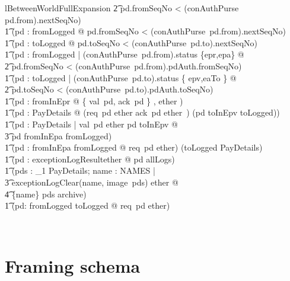 \begin{LNewLemma}
\begin{theorem}{lBetweenWorldFullExpansion}
                \t2 \land pd.fromSeqNo < (conAuthPurse~ pd.from).nextSeqNo) \land \\ \t1
            (\forall pd : fromLogged @  pd.fromSeqNo < (conAuthPurse~pd.from).nextSeqNo) \land \\ \t1
            (\forall pd : toLogged @ pd.toSeqNo < (conAuthPurse~pd.to).nextSeqNo) \land  \\ \t1
            (\forall pd : fromLogged | (conAuthPurse~pd.from).status \in \{epr,epa\} @  \\ %
                \t2 pd.fromSeqNo < (conAuthPurse~pd.from).pdAuth.fromSeqNo) \land \\ \t1
            (\forall pd : toLogged | (conAuthPurse~pd.to).status \in \{ epv,eaTo \} @ \\ %
                \t2 pd.toSeqNo < (conAuthPurse~pd.to).pdAuth.toSeqNo) \land \\ \t1
            (\forall pd : fromInEpr @ \disjoint \langle \{ val~pd, ack~pd \} , ether \rangle) \land \\ \t1
            (\forall pd : PayDetails @ (req~pd \in ether \land ack~pd \notin ether~)
                \iff (pd \in toInEpv \cup toLogged)) \\ \t1
            \land (\forall pd : PayDetails | val~pd \in ether \land pd \in toInEpv @ \\ %
                \t3 pd \in fromInEpa \cup fromLogged) \land \\ \t1
            (\forall pd : fromInEpa \cup fromLogged @  req~pd \in ether) \land
            (toLogged \in \finset PayDetails) \land \\ \t1
            (\forall pd : exceptionLogResult\inv \limg ether \rimg @ pd \in allLogs) \land \\ \t1
            (\forall pds : \power_1 PayDetails; name : NAMES | \\ %
                    \t3 exceptionLogClear(name, image~pds) \in ether @ \\ %
                \t4 \{name\} \cross pds \subseteq archive) \land \\ \t1
            (\forall pd: fromLogged \cup toLogged @ req~pd \in ether)
\end{theorem}~\end{LNewLemma}


\section{Framing schema}\label{ch5.phibop}


